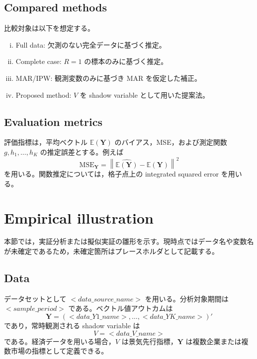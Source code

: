 \documentclass[10pt,a4paper]{article}
\newcommand{\E}{\mathbb{E}}
\newcommand{\1}{\mathbf{1}}
\newcommand{\Y}{\bm{Y}}
\begin{document}
\subsection{Compared methods}

比較対象は以下を想定する。
\begin{enumerate}[(i)]
  \item Full data: 欠測のない完全データに基づく推定。
  \item Complete case: $R=1$ の標本のみに基づく推定。
  \item MAR/IPW: 観測変数のみに基づき MAR を仮定した補正。
  \item Proposed method: $V$ を shadow variable として用いた提案法。
\end{enumerate}

\subsection{Evaluation metrics}

評価指標は，平均ベクトル $\E(\Y)$ のバイアス，MSE，および測定関数 $g,h_1,\ldots,h_K$ の推定誤差とする。例えば
\begin{equation}
  \mathrm{MSE}_{\Y}=\left\|\widehat{\E(\Y)}-\E(\Y)\right\|^2
\end{equation}
を用いる。関数推定については，格子点上の integrated squared error を用いる。

\section{Empirical illustration}

本節では，実証分析または擬似実証の雛形を示す。現時点ではデータ名や変数名が未確定であるため，未確定箇所はプレースホルダとして記載する。

\subsection{Data}

データセットとして $<data\_source\_name>$ を用いる。分析対象期間は $<sample\_period>$ である。ベクトル値アウトカムは
\begin{equation}
  \Y=(<data\_Y1\_name>,\ldots,<data\_YK\_name>)'
\end{equation}
であり，常時観測される shadow variable は
\begin{equation}
  V=<data\_V\_name>
\end{equation}
である。経済データを用いる場合，$V$ は景気先行指標，$\Y$ は複数企業または複数市場の指標として定義できる。
\end{document}
